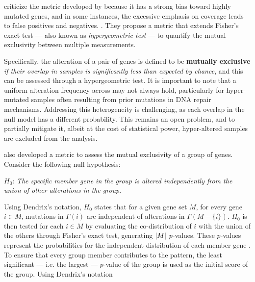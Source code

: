 \textcite{mutex} criticize the metric developed by \textcite{dendrix} because it has a strong bias toward highly mutated genes, and in some instances, the excessive emphasis on coverage leads to false positives and negatives. . They propose a metric that extends Fisher's exact test --- also known as \textit{hypergeometric test} --- to quantify the mutual exclusivity between multiple measurements.

Specifically, the alteration of a pair of genes is defined to be \textbf{mutually exclusive} \textit{if their overlap in samples is significantly less than expected by chance}, and this can be assessed through a hypergeometric test.  It is important to note that a uniform alteration frequency across may not always hold, particularly for hyper-mutated samples often resulting from prior mutations in DNA repair mechanisms. Addressing this heterogeneity is challenging, as each overlap in the null model has a different probability. This remains an open problem, and to partially mitigate it, albeit at the cost of statistical power, hyper-altered samples are excluded from the analysis. 

\textcite{mutex} also developed a metric to assess the mutual exclusivity of a group of genes. Consider the following null hypothesis:

\begin{displayquote}
    $H_0$: \textit{The specific member gene in the group is altered independently from the union of other alterations in the group}.
\end{displayquote}

Using Dendrix's notation, $H_0$ states that for a given gene set $M$, for every gene $i \in M$, mutations in $\Gamma(i)$ are independent of alterations in $\Gamma(M - \{i\})$. $H_0$ is then tested for each $i \in M$ by evaluating the co-distribution of $i$ with the union of the others through Fisher's exact test, generating $\left|M\right|$ $p$-values. These $p$-values represent the probabilities for the independent distribution of each member gene . To ensure that every group member contributes to the pattern, the least significant --- i.e. the largest --- $p$-value of the group is used as the initial score of the group. Using Dendrix's notation

